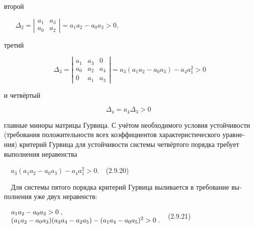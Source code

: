 \documentclass[a4paper]{article}
\begin{document}
{\begin{russian}\sffamily
второй
\end{russian}}

{\begin{russian}\sffamily
\ \  $\text{      }Δ_2=|\begin{matrix}a_1&a_3\\a_0&a_2\end{matrix}|=a_1a_2-a_0a_3>0$,
\end{russian}}

{\begin{russian}\sffamily
третий
\end{russian}}

\begin{equation*}
\text{    }Δ_3=|\begin{matrix}a_1&a_3&0\\a_0&a_2&a_4\\0&a_1&a_3\end{matrix}|=a_3(a_1a_2-a_0a_3)-a_4a_1^2>0
\end{equation*}
{\begin{russian}\sffamily
и четвёртый
\end{russian}}

\begin{equation*}
\;Δ_4=a_4Δ_3>0
\end{equation*}
{\begin{russian}\sffamily
главные миноры матрицы Гурвица. С учётом необходимого условия устойчивости (требования положительности всех
коэффициентов характеристического уравнения) критерий Гурвица для устойчивости системы четвёртого порядка требует
выполнения неравенства
\end{russian}}

{\begin{russian}\sffamily
\ \  $a_3(a_1a_2-a_0a_3)-a_4a_1^2>0$.\ \ (2.9.20)
\end{russian}}

{\begin{russian}\sffamily
\ \ Для системы пятого порядка критерий Гурвица выливается в требование выполнения уже двух неравенств:
\end{russian}}

{\begin{russian}\sffamily
\ \  $\begin{matrix}a_1a_2-a_0a_3>0\;,\hfill\null \\(a_1a_2-a_0a_3)(a_3a_4-a_2a_5)-(a_1a_4-a_0a_5)^2>0\;.\hfill\null
\end{matrix}\hfill $\ \ (2.9.21)
\end{russian}}
\end{document}
